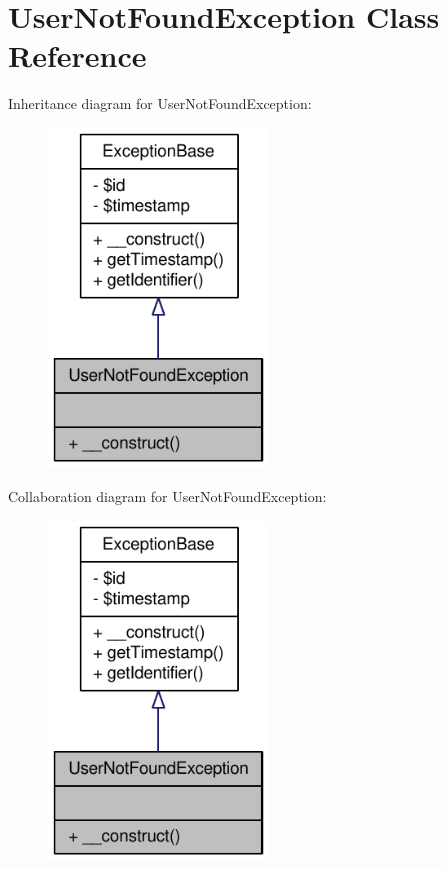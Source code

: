 \hypertarget{classUserNotFoundException}{
\section{UserNotFoundException Class Reference}
\label{classUserNotFoundException}
}


Inheritance diagram for UserNotFoundException:\nopagebreak
\begin{figure}[H]
\begin{center}
\leavevmode
\includegraphics[width=166pt]{classUserNotFoundException__inherit__graph}
\end{center}
\end{figure}


Collaboration diagram for UserNotFoundException:\nopagebreak
\begin{figure}[H]
\begin{center}
\leavevmode
\includegraphics[width=166pt]{classUserNotFoundException__coll__graph}
\end{center}
\end{figure}
